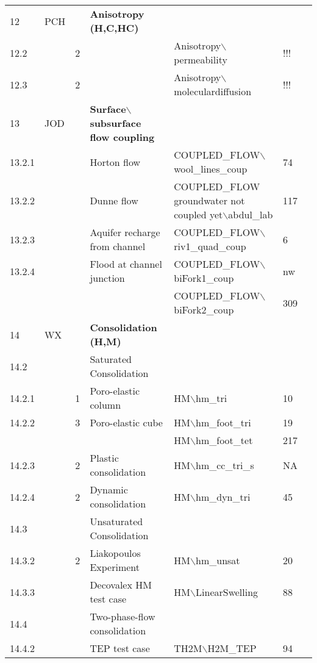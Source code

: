 \begin{landscape}
\begin{center}
\begin{tabularx}{\linewidth}{lllXXll}
12&PCH&&\textbf{Anisotropy (H,C,HC)}&&&\\
12.2&&          2&&             Anisotropy$\backslash$permeability&!!!&\\
12.3&&          2&&             Anisotropy$\backslash$moleculardiffusion&!!!&\\
\midrule

13&JOD&&        \textbf{Surface$\backslash$subsurface flow coupling}&&&\\

13.2.1&&        & Horton flow&COUPLED\_FLOW$\backslash$wool\_lines\_coup&74&\\
13.2.2&&  &     Dunne flow&COUPLED\_FLOW groundwater not coupled yet$\backslash$abdul\_lab&117&\\
13.2.3&&        &       Aquifer recharge from channel&  COUPLED\_FLOW$\backslash$riv1\_quad\_coup&6&\\
13.2.4&&        &       Flood at channel junction&      COUPLED\_FLOW$\backslash$biFork1\_coup&nw&\\
&&&& COUPLED\_FLOW$\backslash$biFork2\_coup&309&\\
\midrule

14&WX&& \textbf{Consolidation (H,M)}&&&\\
14.2&&& Saturated Consolidation&&&\\
14.2.1&&                1&      Poro-elastic column      &      HM$\backslash$hm\_tri&10&\\
14.2.2&&                3&      Poro-elastic cube                & HM$\backslash$hm\_foot\_tri&19&\\
&&&                                                                                                                                      & HM$\backslash$hm\_foot\_tet&217&\\
14.2.3&&                2&      Plastic consolidation&  HM$\backslash$hm\_cc\_tri\_s&NA&\\
14.2.4&&                2&      Dynamic consolidation&  HM$\backslash$hm\_dyn\_tri&45&\\
14.3    &&               &      Unsaturated Consolidation&&&\\
14.3.2&&                2&Liakopoulos Experiment&       HM$\backslash$hm\_unsat&20&\\
14.3.3&&                 &Decovalex HM test case&HM$\backslash$LinearSwelling&88&\\
14.4&&                   &Two-phase-flow consolidation&&&\\
14.4.2&&                 &TEP test case&TH2M$\backslash$H2M\_TEP&94&\\
\midrule


\end{tabularx}
\end{center}
\end{landscape}
